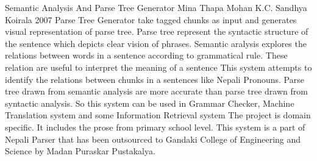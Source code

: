 \begin{conf-abstract}[]
{Semantic Analysis And Parse Tree Generator}
{
	Mina Thapa
	Mohan K.C.
	Sandhya Koirala
}
{2007}
Parse Tree Generator take tagged chunks as input and generates visual
representation of parse tree. Parse tree represent the syntactic structure of the
sentence which depicts clear vision of phrases.
Semantic aralysis explores the relations between words in a sentence
according to grammatical rule. These relation are useful to interpret the meaning
of a sentence This system attempts to identify the relations between chunks in a
sentences like Nepali Pronouns.
Parse tree drawn from semantic analysis are more accurate than parse
tree drawn from syntactic analysis. So this system can be used in Grammar
Checker, Machine Translation system and some Information Retrieval system
The project is domain specific. It includes the prose from primary
school level. This system is a part of Nepali Parser that has been outsourced to
Gandaki College of Engineering and Science by Madan Puraskar Pustakalya.
  \end{conf-abstract}